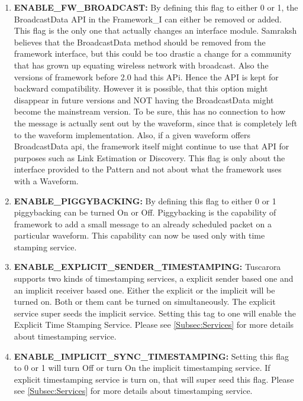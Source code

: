 \begin{enumerate}
	\item \textbf{ENABLE\_FW\_BROADCAST:} By defining this flag to either 0 or 1, the BroadcastData API in the Framework\_I can either be removed or added. This flag is the only one that actually changes an interface module. Samraksh believes that the BroadcastData method should be removed from the framework interface, but this could be too drastic a change for a community that has grown up equating wireless network with broadcast. Also the versions of framework before 2.0 had this APi. Hence the API is kept for backward compatibility. However it is possible, that this option might disappear in future versions and NOT having the BroadcastData might  become the mainstream version. 
	To be sure, this has no connection to how the message is actually sent out by the waveform, since that is completely left to the waveform implementation. Also, if a given waveform offers BroadcastData api, the framework itself might continue to use that API for purposes such as Link Estimation or Discovery. This flag is only about the interface provided to the Pattern and not about what the framework uses with a Waveform.
	
	\item \textbf{ENABLE\_PIGGYBACKING:} By defining this flag to either 0 or 1 piggybacking can be turned On or Off. Piggybacking is the capability of framework to add a small message  to an already scheduled packet on a particular waveform. This capability can now be used only with time stamping service.
	\item \textbf{ENABLE\_EXPLICIT\_SENDER\_TIMESTAMPING:} Tuscarora supports two kinds of timestamping services, a explicit sender based one and an implicit receiver based one. Either the explicit or the implicit will be turned on. Both or them cant be turned on simultaneously. The explicit service super seeds the implicit service. Setting this tag to one will enable the Explicit Time Stamping Service.  Please see \cref{Subsec:Services} for more details about timestamping service.
	\item \textbf{ENABLE\_IMPLICIT\_SYNC\_TIMESTAMPING:} Setting this flag to 0 or 1 will turn Off or turn On the implicit timestamping service. If explicit timestamping service is turn on, that will super seed this flag. Please see \cref{Subsec:Services} for more details about timestamping service. 
	
\end{enumerate}

